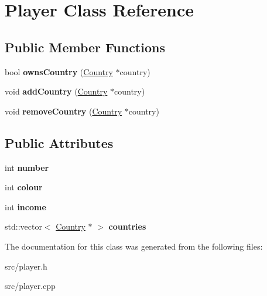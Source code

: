 \hypertarget{class_player}{}\section{Player Class Reference}
\label{class_player}
\subsection*{Public Member Functions}
\begin{DoxyCompactItemize}
\item 
\hypertarget{class_player_afb5d7b209f1a554deb921d60433130a0}{}bool {\bfseries owns\+Country} (\hyperlink{class_country}{Country} $\ast$country)\label{class_player_afb5d7b209f1a554deb921d60433130a0}

\item 
\hypertarget{class_player_af5fb0c8aff4eb80c072e958707b1f6d6}{}void {\bfseries add\+Country} (\hyperlink{class_country}{Country} $\ast$country)\label{class_player_af5fb0c8aff4eb80c072e958707b1f6d6}

\item 
\hypertarget{class_player_a6da51346f6a07b872e2c35faca141191}{}void {\bfseries remove\+Country} (\hyperlink{class_country}{Country} $\ast$country)\label{class_player_a6da51346f6a07b872e2c35faca141191}

\end{DoxyCompactItemize}
\subsection*{Public Attributes}
\begin{DoxyCompactItemize}
\item 
\hypertarget{class_player_af14f0d6ce7546bc1ded859df40cd8819}{}int {\bfseries number}\label{class_player_af14f0d6ce7546bc1ded859df40cd8819}

\item 
\hypertarget{class_player_ab5d1eafeb6c33bbe5bfc3205a3adf36d}{}int {\bfseries colour}\label{class_player_ab5d1eafeb6c33bbe5bfc3205a3adf36d}

\item 
\hypertarget{class_player_add605b5c083c3391c3d1abf000471731}{}int {\bfseries income}\label{class_player_add605b5c083c3391c3d1abf000471731}

\item 
\hypertarget{class_player_abc6528de5a3f2cb217723a553492b4c2}{}std\+::vector$<$ \hyperlink{class_country}{Country} $\ast$ $>$ {\bfseries countries}\label{class_player_abc6528de5a3f2cb217723a553492b4c2}

\end{DoxyCompactItemize}


The documentation for this class was generated from the following files\+:\begin{DoxyCompactItemize}
\item 
src/player.\+h\item 
src/player.\+cpp\end{DoxyCompactItemize}
